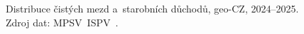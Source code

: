 \def\strProblemyMzdaDuchodCaption{Distribuce čistých mezd a~starobních důchodů, \acs{geo-CZ}, 2024--2025. Zdroj dat: \acs{MPSV}~\acs{ISPV}~\cite{mpsv_ispv}.}%
%
\begin{figure}[htbp]
  \centering
  \resizebox{0.95\linewidth}{!}{}
  \caption{\strProblemyMzdaDuchodCaption}
  \label{fig:problemy_mzda_duchod}
\end{figure}
